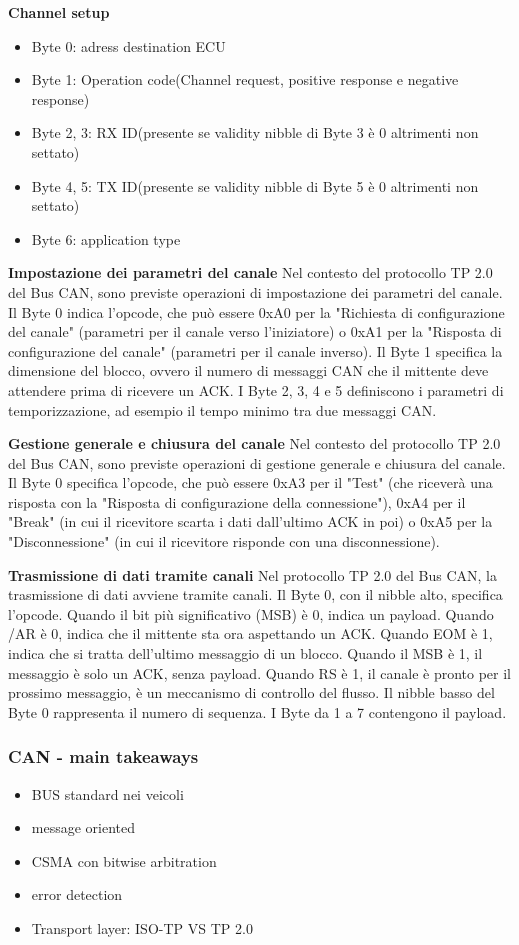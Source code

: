 \textbf{Channel setup}
\begin{itemize}
  \item Byte 0: adress destination ECU
  \item Byte 1: Operation code(Channel request, positive response e negative response)
  \item Byte 2, 3: RX ID(presente se validity nibble di Byte 3 è 0 altrimenti non settato)
  \item Byte 4, 5: TX ID(presente se validity nibble di Byte 5 è 0 altrimenti non settato)
  \item Byte 6: application type
\end{itemize}





\textbf{Impostazione dei parametri del canale}
Nel contesto del protocollo TP 2.0 del Bus CAN, sono previste operazioni di impostazione dei parametri del canale. Il Byte 0 indica l'opcode, che può essere 0xA0 per la "Richiesta di configurazione del canale" (parametri per il canale verso l'iniziatore) o 0xA1 per la "Risposta di configurazione del canale" (parametri per il canale inverso). Il Byte 1 specifica la dimensione del blocco, ovvero il numero di messaggi CAN che il mittente deve attendere prima di ricevere un ACK. I Byte 2, 3, 4 e 5 definiscono i parametri di temporizzazione, ad esempio il tempo minimo tra due messaggi CAN.

\textbf{Gestione generale e chiusura del canale}
Nel contesto del protocollo TP 2.0 del Bus CAN, sono previste operazioni di gestione generale e chiusura del canale. Il Byte 0 specifica l'opcode, che può essere 0xA3 per il "Test" (che riceverà una risposta con la "Risposta di configurazione della connessione"), 0xA4 per il "Break" (in cui il ricevitore scarta i dati dall'ultimo ACK in poi) o 0xA5 per la "Disconnessione" (in cui il ricevitore risponde con una disconnessione).

\textbf{Trasmissione di dati tramite canali}
Nel protocollo TP 2.0 del Bus CAN, la trasmissione di dati avviene tramite canali. Il Byte 0, con il nibble alto, specifica l'opcode. Quando il bit più significativo (MSB) è 0, indica un payload. Quando /AR è 0, indica che il mittente sta ora aspettando un ACK. Quando EOM è 1, indica che si tratta dell'ultimo messaggio di un blocco. Quando il MSB è 1, il messaggio è solo un ACK, senza payload. Quando RS è 1, il canale è pronto per il prossimo messaggio, è un meccanismo di controllo del flusso. Il nibble basso del Byte 0 rappresenta il numero di sequenza. I Byte da 1 a 7 contengono il payload.





\subsubsection{CAN - main takeaways}

\begin{itemize}
  \item BUS standard nei veicoli
  \item message oriented
  \item CSMA con bitwise arbitration
  \item error detection
  \item Transport layer: ISO-TP VS TP 2.0
\end{itemize}


